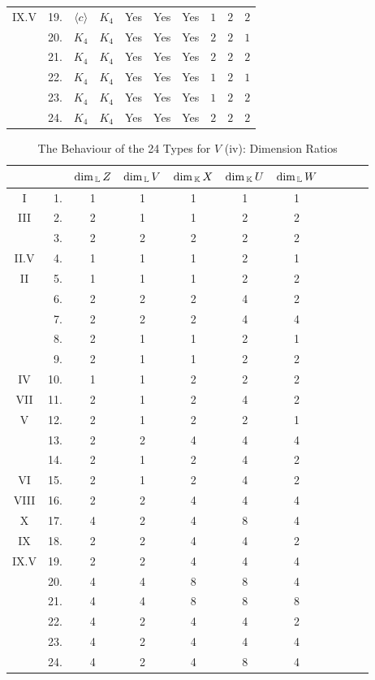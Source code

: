 \begin{table}[p]
\begin{tabular}{c r c c c c c c c c}
IX.V & 19. & $\langle c \rangle$ & $K_4$ & Yes & Yes & Yes & $1$ & $2$ & $2$ \\ 
& 20. & $K_4$ & $K_4$ & Yes & Yes & Yes & $2$ & $2$ & $1$ \\ 
& 21. & $K_4$ & $K_4$ & Yes & Yes & Yes & $2$  & $2$ & $2$ \\ 
& 22. & $K_4$ & $K_4$ & Yes & Yes & Yes & $1$ & $2$ & $1$ \\ 
& 23. & $K_4$ & $K_4$ & Yes & Yes & Yes & $1$ & $2$ & $2$ \\ 
& 24. & $K_4$ & $K_4$ & Yes & Yes & Yes & $2$ & $2$ & $2$ \\
\bottomrule
\end{tabular}
\egroup
\end{table}


\begin{table}[p] %
    \vspace{4cm}
\centering
\bgroup
\caption{The Behaviour of the 24 Types for $V$ (iv): Dimension Ratios}
\label{tab:24types5.5}
\def\arraystretch{1.1}
\begin{tabular}{c r c c c c c c c c c}
    \toprule
    & & $\dim_{\, {\mathbb L}}Z$ & $\dim_{\, {\mathbb L}} V$ & $\dim_{\, {\mathbb K}}X$ & $\dim_{\, {\mathbb K}}U$ & $\dim_{\, {\mathbb L}} W$ \\
    \midrule
I & 1.  & 1 & 1 & 1 & 1 & 1 \\  
III & 2.  & 2 & 1 & 1 & 2 & 2 \\ 
& 3.  & 2 & 2 & 2 & 2 & 2 \\ 
II.V & 4.  & 1 & 1 & 1 & 2 & 1 \\ 
II & 5.  & 1 & 1 & 1 & 2 & 2 \\ 
& 6.  & 2 & 2 & 2 & 4 & 2 \\ 
& 7.  & 2 & 2 & 2 & 4 & 4 \\ 
& 8.  & 2 & 1 & 1 & 2 & 1 \\ 
& 9.  & 2 & 1 & 1 & 2 & 2 \\ 
IV & 10. & 1 & 1 & 2 & 2 & 2 \\ 
VII & 11. & 2 & 1 & 2 & 4 & 2 \\ 
V & 12. & 2 & 1 & 2 & 2 & 1 \\ 
& 13. & 2 & 2 & 4 & 4 & 4 \\ 
& 14. & 2 & 1 & 2 & 4 & 2 \\ 
VI & 15. & 2 & 1 & 2 & 4 & 2 \\ 
VIII & 16. & 2 & 2 & 4 & 4 & 4 \\ 
X & 17. & 4 & 2 & 4 & 8 & 4 \\ 
IX & 18. & 2 & 2 & 4 & 4 & 2 \\
IX.V & 19. & 2 & 2 & 4 & 4 & 4 \\ 
& 20. & 4 & 4 & 8 & 8 & 4 \\ 
& 21. & 4 & 4 & 8 & 8 & 8 \\ 
& 22. & 4 & 2 & 4 & 4 & 2 \\ 
& 23. & 4 & 2 & 4 & 4 & 4 \\ 
& 24. & 4 & 2 & 4 & 8 & 4 \\
\bottomrule
\end{tabular}
\egroup
\end{table}

